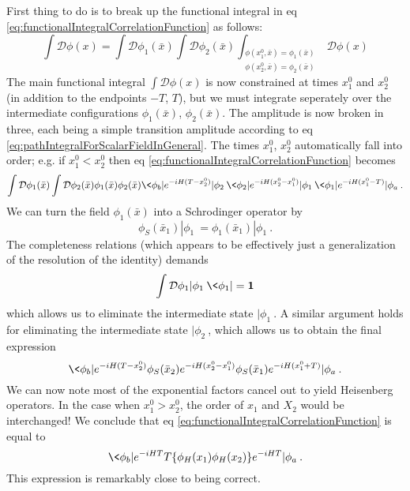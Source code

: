 First thing to do is to break up the functional integral in eq
\eqref{eq:functionalIntegralCorrelationFunction} as follows:
\begin{equation}%
\int\mathcal{D}\phi(x) =
\int\mathcal{D}\phi_{1}(\bar{x})\int\mathcal{D}\phi_{2}(\bar{x})\int_{\substack{
\phi(x^{0}_{1},\bar{x})=\phi_{1}(\bar{x})\\
\phi(x^{0}_{2},\bar{x})=\phi_{2}(\bar{x})
}}\mathcal{D}\phi(x)
\end{equation}
The main functional integral $\int\mathcal{D}\phi(x)$ is now
constrained at times $x^{0}_{1}$ and $x^{0}_{2}$ (in addition to
the endpoints $-T$, $T$), but we must integrate seperately over
the intermediate configurations $\phi_1(\bar{x})$,
$\phi_{2}(\bar{x})$. The amplitude is now broken in three, each
being a simple transition amplitude according to eq
\eqref{eq:pathIntegralForScalarFieldInGeneral}. The times
$x^{0}_{1}$, $x^{0}_{2}$ automatically fall into order; e.g. if
$x^{0}_{1}<x^{0}_{2}$ then eq
\eqref{eq:functionalIntegralCorrelationFunction} becomes
\begin{equation}%
\int\mathcal{D}\phi_{1}(\bar{x})
\int\mathcal{D}\phi_{2}(\bar{x})
\phi_{1}(\bar{x})\phi_{2}(\bar{x})
\<\phi_{b}|e^{-iH(T-x^{0}_{2})}|\phi_2\>
\<\phi_2|e^{-iH(x^{0}_{2}-x^{0}_{1})}|\phi_{1}\>
\<\phi_{1}|e^{-iH(x^{0}_{1}-T)}|\phi_{a}\>.
\end{equation}
We can turn the field $\phi_{1}(\bar{x})$ into a Schrodinger
operator by
\begin{equation}%
\phi_{S}(\bar{x}_{1})|\phi_{1}\> =
\phi_{1}(\bar{x}_{1})|\phi_{1}\>.
\end{equation}
The completeness relations (which appears to be effectively just
a generalization of the resolution of the identity) demands
\begin{equation}%
\int\mathcal{D}\phi_{1}|\phi_{1}\>\<\phi_{1}| = \mathbf{1}
\end{equation}
which allows us to eliminate the intermediate state
$|\phi_1\>$. A similar argument holds for eliminating the
intermediate state $|\phi_{2}\>$, which allows us to obtain the
final expression
\begin{equation}%
\<\phi_b|e^{-iH(T-x^{0}_{2})}\phi_{S}(\bar{x}_2)e^{-iH(x^{0}_{2}-x^{0}_{1})}\phi_{S}(\bar{x}_{1})e^{-iH(x^{0}_{1}+T)}|\phi_{a}\>.
\end{equation}
We can now note most of the exponential factors cancel out to
yield Heisenberg operators. In the case when
$x^{0}_{1}>x^{0}_{2}$, the order of $x_1$ and $X_2$ would be
interchanged! We conclude that eq
\eqref{eq:functionalIntegralCorrelationFunction} is equal to
\begin{equation}%
\<\phi_b|e^{-iHT}T\{\phi_{H}(x_1)\phi_{H}(x_2)\}e^{-iHT}|\phi_a\>.
\end{equation}
This expression is remarkably close to being correct.

